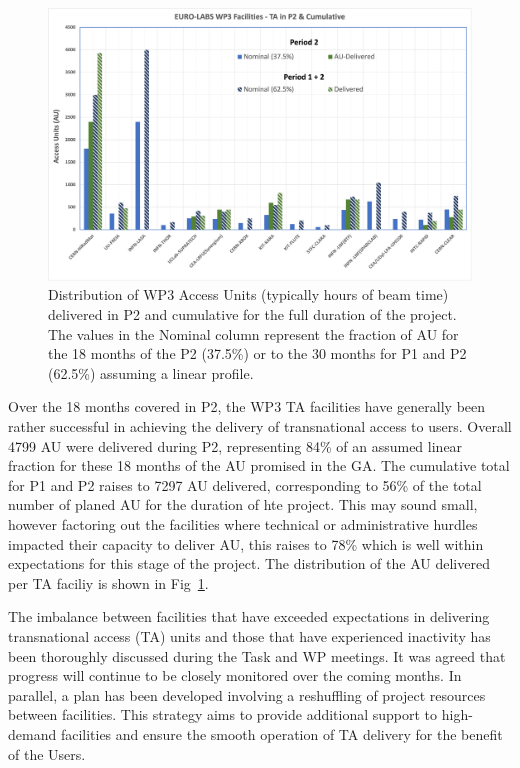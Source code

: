 \begin{figure}[!h]
    \centering
    \includegraphics[width=0.98\linewidth]{graphics/WP3-TAstatistics.png}
    \caption{Distribution of WP3 Access Units (typically hours of beam time) delivered in P2 and cumulative for the full duration of the project. The values in the Nominal column represent the fraction of AU for the 18 months of the P2 (37.5\%) or to the 30 months for P1 and P2 (62.5\%) assuming a linear profile.}
    \label{fig:wpe-taunits}
\end{figure}
Over the 18 months covered in P2, the WP3 TA facilities have generally been rather successful in achieving the delivery of transnational access to users. Overall 4799 AU were delivered during P2, representing 84\% of an assumed linear fraction for these 18 months of the AU promised in the GA. The cumulative total for P1 and P2 raises to 7297 AU delivered, corresponding to 56\% of the total number of planed AU for the duration of hte project. This may sound small, however factoring out the facilities where technical or administrative hurdles impacted their capacity to deliver AU, this raises to 78\% which is well within expectations for this stage of the project. The distribution of the AU delivered per TA faciliy is shown in Fig~\ref{fig:wpe-taunits}.

The imbalance between facilities that have exceeded expectations in delivering transnational access (TA) units and those that have experienced inactivity has been thoroughly discussed during the Task and WP meetings. It was agreed that progress will continue to be closely monitored over the coming months. In parallel, a plan has been developed involving a reshuffling of project resources between facilities. This strategy aims to provide additional support to high-demand facilities and ensure the smooth operation of TA delivery for the benefit of the Users.

